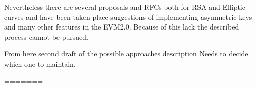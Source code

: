 Nevertheless there are several proposals and RFCs both for RSA and Elliptic curves \citep{ECImplementation} \citep{RSAImplementation} and have been taken place suggestions of implementing asymmetric keys and many other features in the EVM2.0.
Because of this lack the described process cannot be pursued.

\begin{notation}
	From here second draft of the possible approaches description
	Needs to decide which one to maintain.
\end{notation}
=======
%
%
%
%
%
